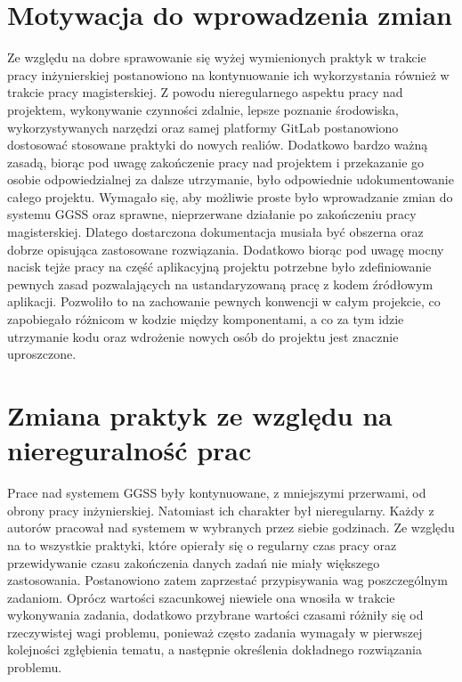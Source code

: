 \section{Motywacja do wprowadzenia zmian}
Ze względu na dobre sprawowanie się wyżej wymienionych praktyk w trakcie pracy inżynierskiej postanowiono na kontynuowanie ich wykorzystania również w trakcie pracy magisterskiej. Z powodu nieregularnego aspektu pracy nad projektem, wykonywanie czynności zdalnie, lepsze poznanie środowiska, wykorzystywanych narzędzi oraz samej platformy GitLab postanowiono dostosować stosowane praktyki do nowych realiów. Dodatkowo bardzo ważną zasadą, biorąc pod uwagę zakończenie pracy nad projektem i przekazanie go osobie odpowiedzialnej za dalsze utrzymanie, było odpowiednie udokumentowanie całego projektu. Wymagało się, aby możliwie proste było wprowadzanie zmian do systemu GGSS oraz sprawne, nieprzerwane działanie po zakończeniu pracy magisterskiej. Dlatego dostarczona dokumentacja musiała być obszerna oraz dobrze opisująca zastosowane rozwiązania. Dodatkowo biorąc pod uwagę mocny nacisk tejże pracy na część aplikacyjną projektu potrzebne było zdefiniowanie pewnych zasad pozwalających na ustandaryzowaną pracę z kodem źródłowym aplikacji. Pozwoliło to na zachowanie pewnych konwencji w całym projekcie, co zapobiegało różnicom w kodzie między komponentami, a co za tym idzie utrzymanie kodu oraz wdrożenie nowych osób do projektu jest znacznie uproszczone.


\section{Zmiana praktyk ze względu na niereguralność prac}

Prace nad systemem GGSS były kontynuowane, z mniejszymi przerwami, od obrony pracy inżynierskiej. Natomiast ich charakter był nieregularny. Każdy z autorów pracował nad systemem w wybranych przez siebie godzinach. Ze względu na to wszystkie praktyki, które opierały się o regularny czas pracy oraz przewidywanie czasu zakończenia danych zadań nie miały większego zastosowania. Postanowiono zatem zaprzestać przypisywania wag poszczególnym zadaniom. Oprócz wartości szacunkowej niewiele ona wnosiła w trakcie wykonywania zadania, dodatkowo przybrane wartości czasami różniły się od rzeczywistej wagi problemu, ponieważ często zadania wymagały w pierwszej kolejności zgłębienia tematu, a następnie określenia dokładnego rozwiązania problemu.

